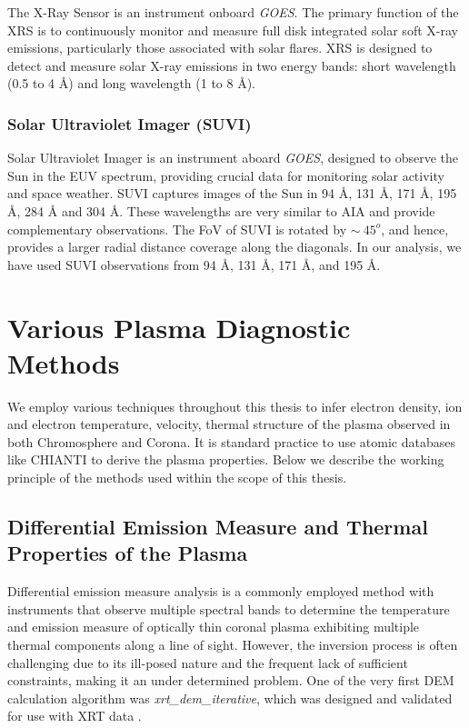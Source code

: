 {The X-Ray Sensor \citep[XRS;][]{xrs} is an instrument onboard {\it GOES}. The primary function of the XRS is to continuously monitor and measure full disk integrated solar soft X-ray emissions, particularly those associated with solar flares. XRS is designed to detect and measure solar X-ray emissions in two energy bands: short wavelength (0.5 to 4 {\AA}) and long wavelength (1 to 8 {\AA}).

\subsubsection{Solar Ultraviolet Imager (SUVI)}

Solar Ultraviolet Imager \citep[SUVI;][]{suvi} is an instrument aboard {\it GOES}, designed to observe the Sun in the EUV spectrum, providing crucial data for monitoring solar activity and space weather. SUVI captures images of the Sun in 94 {\AA}, 131 {\AA}, 171 {\AA}, 195 {\AA}, 284 {\AA} and 304 {\AA}. These wavelengths are very similar to AIA and provide complementary observations. The FoV of SUVI is rotated by $\sim~45^{o}$, and hence, provides a larger radial distance coverage along the diagonals. In our analysis, we have used SUVI observations from 94 {\AA}, 131 {\AA}, 171 {\AA}, and 195 {\AA}.

\section{Various Plasma Diagnostic Methods}

We employ various techniques throughout this thesis to infer electron density, ion and electron temperature, velocity, thermal structure of the plasma observed in both Chromosphere and Corona. It is standard practice to use atomic databases like CHIANTI \citep{chianti,chianti1} to derive the plasma properties. Below we describe the working principle of the methods used within the scope of this thesis.

\subsection{Differential Emission Measure and Thermal Properties of the Plasma}\label{sec:c2_dem}

Differential emission measure analysis is a commonly employed method with instruments that observe multiple spectral bands to determine the temperature and emission measure of optically thin coronal plasma exhibiting multiple thermal components along a line of sight. However, the inversion process is often challenging due to its ill-posed nature and the frequent lack of sufficient constraints, making it an under determined problem. One of the very first DEM calculation algorithm was {\it xrt\_dem\_iterative}, which was designed and validated for use with XRT data \citep{golub04,weber04}.

}
